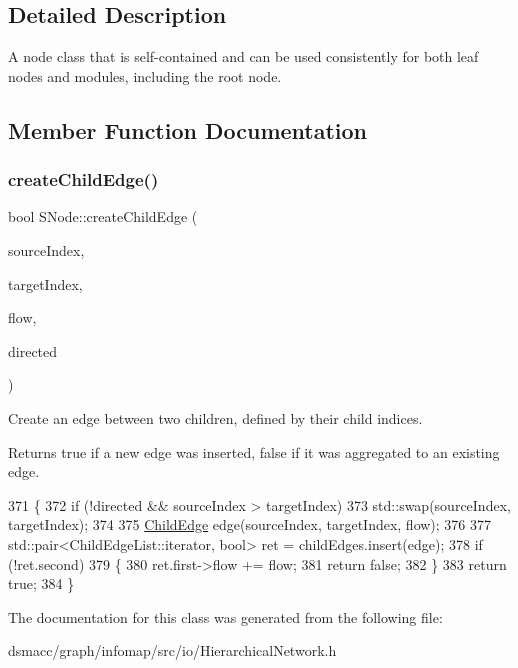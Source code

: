 \subsection{Detailed Description}
A node class that is self-\/contained and can be used consistently for both leaf nodes and modules, including the root node. 

\subsection{Member Function Documentation}
\mbox{\label{classSNode_ae6682b903bf066ca1b3d71403f92d9d7}} 
\subsubsection{\texorpdfstring{create\+Child\+Edge()}{createChildEdge()}}
{\footnotesize\ttfamily bool S\+Node\+::create\+Child\+Edge (\begin{DoxyParamCaption}\item[{Serial\+Types\+::edge\+Size\+\_\+t}]{source\+Index,  }\item[{Serial\+Types\+::edge\+Size\+\_\+t}]{target\+Index,  }\item[{double}]{flow,  }\item[{bool}]{directed }\end{DoxyParamCaption})\hspace{0.3cm}{\ttfamily [inline]}}

Create an edge between two children, defined by their child indices. \begin{DoxyReturn}{Returns}
true if a new edge was inserted, false if it was aggregated to an existing edge. 
\end{DoxyReturn}

\begin{DoxyCode}
371     \{
372         \textcolor{keywordflow}{if} (!directed && sourceIndex > targetIndex)
373             std::swap(sourceIndex, targetIndex);
374 
375         \mbox{\hyperlink{structChildEdge}{ChildEdge}} edge(sourceIndex, targetIndex, flow);
376 
377         std::pair<ChildEdgeList::iterator, bool> ret = childEdges.insert(edge);
378         \textcolor{keywordflow}{if} (!ret.second)
379         \{
380             ret.first->flow += flow;
381             \textcolor{keywordflow}{return} \textcolor{keyword}{false};
382         \}
383         \textcolor{keywordflow}{return} \textcolor{keyword}{true};
384     \}
\end{DoxyCode}


The documentation for this class was generated from the following file\+:\begin{DoxyCompactItemize}
\item 
dsmacc/graph/infomap/src/io/Hierarchical\+Network.\+h\end{DoxyCompactItemize}
